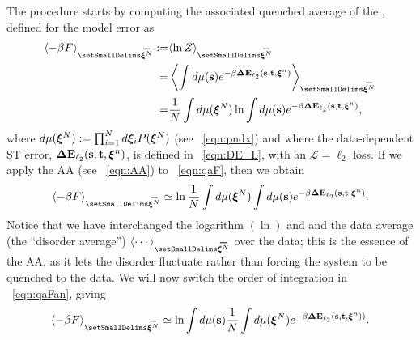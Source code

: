 
The procedure starts by computing the associated quenched average of
the \FreeEnergy, defined for the model error as
\begin{align}
\nonumber
\langle-\beta F \rangle_{\AVGNDXI} 
   :=& \langle \ln Z \rangle_{\AVGNDXI} \\ 
\nonumber
   =&\left\langle \int d\mu(\SVEC)e^{-\beta\DETOPSTLL} \right\rangle_{\AVGNDXI}  \\ 
\label{eqn:qaF}
   =& \frac{1}{N}\int d\mu(\NDXI)\ln\int d\mu(\SVEC)e^{-\beta\DETOPSTLL}   ,
\end{align}
where $d\mu(\boldsymbol{\xi}^{N}):=\prod_{i=1}^{N}d\boldsymbol{\xi}_{i} P(\boldsymbol{\xi}^{N})$ (see \EQN~\ref{eqn:pndx}) and
where the data-dependent ST error, $\mathbf{\Delta {E}}_{\ell_2}({\mathbf{s}},{\mathbf{t}}, \boldsymbol{\xi}^{n})$, is defined in \EQN~\ref{eqn:DE_L},
with an $\mathcal{L}=\ell_2$ loss.
%
If we apply the AA (see \EQN~\ref{eqn:AA}) to \EQN~\ref{eqn:qaF}, then we obtain
\begin{align}
\label{eqn:qaFan}
\langle-\beta F \rangle_{\AVGNDXI} \simeq 
   \ln \frac{1}{N}\int d\mu(\NDXI) \int d\mu(\SVEC) e^{-\beta\DETOPSTLL}   .
\end{align}
%
Notice that we have interchanged the logarithm $(\ln)$ and
and the data average (the “disorder average”) 
$\langle\cdots\rangle_{\AVGNDXI}$ over the data; 
this is the essence of the AA, as it lets the disorder fluctuate rather than forcing the system to be quenched to the data.
%
We will now switch the order of integration in \EQN~\ref{eqn:qaFan}, giving
\begin{align}
\label{eqn:qaFan3}
\langle-\beta F \rangle_{\AVGNDXI} \simeq 
   \ln \int d\mu(\SVEC)\frac{1}{N}\int d\mu(\NDXI)e^{-\beta\DETOPSTLL)}   .
\end{align}


